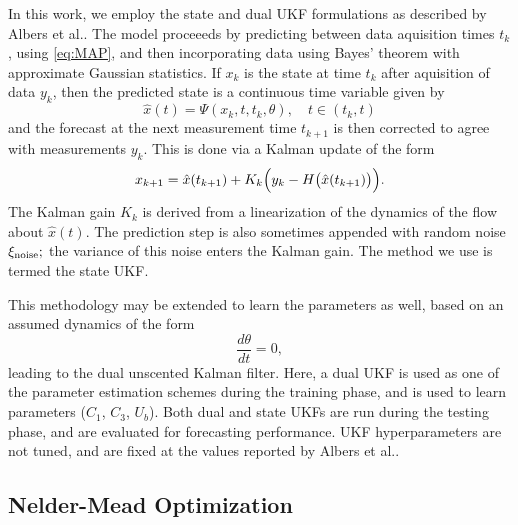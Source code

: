 \documentclass[10pt,letterpaper]{article}
\newcommand{\xin}{\xi_{\rm noise}}
\begin{document}
In this work, we employ the state and dual UKF formulations as described by Albers et al..
The model proceeeds by predicting between data aquisition times $t_k$, using \eqref{eq:MAP}, and then incorporating data using Bayes' theorem with approximate Gaussian statistics. 
If $x_k$ is the state at time $t_k$ after aquisition of data $y_k$, then
the predicted state is a continuous time variable given by
\begin{equation}
\label{predict}
\hat{x}(t)=\Psi(x_k,t,t_k,\theta), \quad t \in (t_k,t)
\end{equation}
and the forecast at the next measurement time $t_{k+1}$
is then corrected to agree with measurements $y_k$. This is done
via a Kalman update of the form 
\begin{equation}
x_{k+1}= \hat{x}(t_{k+1}) + K_k\Bigl(y_k - H\bigl(\hat{x}(t_{k+1})\bigr)\Bigr).
\end{equation}
The Kalman gain $K_k$ is derived from a linearization of the dynamics of the flow about
$\hat{x}(t).$
The prediction step is also sometimes appended with random noise $\xin;$ the variance
of this noise enters the Kalman gain.
The method we use is termed the state UKF.


This methodology may be extended to learn the parameters as well, based on an
assumed dynamics of the form
$$\frac{d\theta}{dt}=0,$$
leading to the dual unscented Kalman filter.
Here, a dual UKF is used as one of the parameter estimation schemes during the training phase, and is used to learn parameters ($C_1$, $C_3$, $U_b$).
Both dual and state UKFs are run during the testing phase, and are evaluated for forecasting performance. UKF hyperparameters are not tuned, and are fixed at the values reported by Albers et al..


\subsection{Nelder-Mead Optimization}
\end{document}
